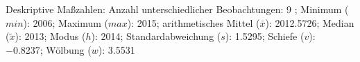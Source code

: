 				\label{tableValues:bfec13d}
				\vspace*{-\baselineskip}
                    \begin{noten}
                	    \note{} Deskriptive Maßzahlen:
                	    Anzahl unterschiedlicher Beobachtungen: 9%
                	    ; 
                	      Minimum ($min$): 2006; 
                	      Maximum ($max$): 2015; 
                	      arithmetisches Mittel ($\bar{x}$): \num[round-mode=places,round-precision=2]{2012.5726}; 
                	      Median ($\tilde{x}$): 2013; 
                	      Modus ($h$): 2014; 
                	      Standardabweichung ($s$): \num[round-mode=places,round-precision=2]{1.5295}; 
                	      Schiefe ($v$): \num[round-mode=places,round-precision=2]{-0.8237}; 
                	      Wölbung ($w$): \num[round-mode=places,round-precision=2]{3.5531}
                     \end{noten}

